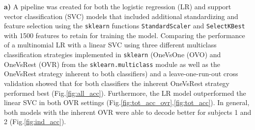 \documentclass[11pt, a4paper]{article}
\begin{document}
\noindent
\textbf{a)} A pipeline was created for both the logistic regression (LR) and support vector classification (SVC) models that included additional standardizing and feature selection using the \verb|sklearn| functions \verb|StandardScaler| and \verb|SelectKBest| with 1500 features to retain for training the model. Comparing the performance of a multinomial LR with a linear SVC using three different multiclass classification strategies implemented in \verb|sklearn| (OneVsOne (OVO) and OneVsRest (OVR) from the \verb|sklearn.multiclass| module as well as the OneVsRest strategy inherent to both classifiers) and a leave-one-run-out cross validation showed that for both classifiers the inherent OneVsRest strategy performed best (Fig.\ref{fig:all_acc}). Furthermore, the LR model outperformed the linear SVC in both OVR settings (Fig.\ref{fig:tot_acc_ovr},\ref{fig:tot_acc}). In general, both models with the inherent OVR were able to decode better for subjects 1 and 2 (Fig.\ref{fig:ind_acc}).
\end{document}
